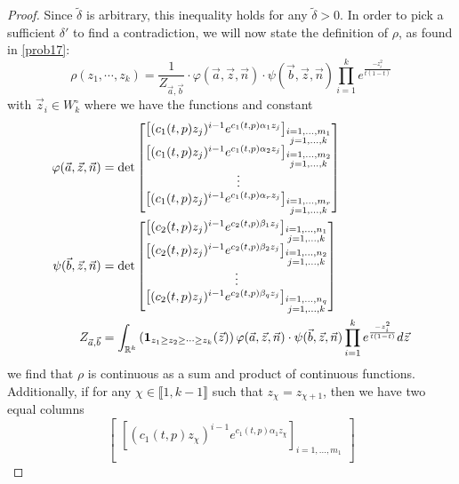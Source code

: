 \begin{proof}
	Since $\tilde\delta$ is arbitrary, this inequality holds for any $\tilde\delta>0$. 
	In order to pick a sufficient $\delta'$ to find a contradiction, we will now state the definition of $\rho$, as found in \ref{prob17}: 
	\[\rho(z_1,\cdots ,z_k)=\frac{1}{Z_{\vec a, \vec b}}\cdot \varphi(\vec a, \vec z, \vec n)\cdot \psi(\vec b, \vec z, \vec n)\prod_{i=1}^{k}e^{\frac{-z_i^2}{t(1-t)}}
	\]
	with $\vec z_i\in W_k^\circ$ where we have the functions and constant
	\begin{align*}
	\varphi(\vec a,\vec z, \vec n)&=\det\begin{bmatrix}
	\left[(c_1(t,p)z_j)^{i-1}e^{c_1(t,p)\alpha_1 z_j}\right]_{\substack{i=1,...,m_1\\j=1,...,k}}\\
	\left[(c_1(t,p)z_j)^{i-1}e^{c_1(t,p)\alpha_2 z_j}\right]_{\substack{i=1,...,m_2\\j=1,...,k}}\\
	\vdots \\
	\left[(c_1(t,p)z_j)^{i-1}e^{c_1(t,p)\alpha_r z_j}\right]_{\substack{i=1,...,m_r\\j=1,...,k}}
	\end{bmatrix}\\
	\psi(\vec b, \vec z, \vec n)&=\det\begin{bmatrix}
	\left[(c_2(t,p)z_j)^{i-1}e^{c_2(t,p)\beta_1 z_j}\right]_{\substack{i=1,...,n_1\\j=1,...,k}}\\
	\left[(c_2(t,p)z_j)^{i-1}e^{c_2(t,p)\beta_2 z_j}\right]_{\substack{i=1,...,n_2\\j=1,...,k}}\\
	\vdots \\
	\left[(c_2(t,p)z_j)^{i-1}e^{c_2(t,p)\beta_q z_j}\right]_{\substack{i=1,...,n_q\\j=1,...,k}}
	\end{bmatrix}\\
	Z_{\vec a, \vec b}&=\int_{\mathbb{R}^k}\left(\operatorname{\mathbf{1}}_{z_1\geq z_2\geq \cdots \geq z_k}(\vec z)\right)\varphi(\vec a, \vec z, \vec n)\cdot \psi(\vec b, \vec z, \vec n)\prod_{i=1}^{k}e^{\frac{-z_i^2}{t(1-t)}} d\vec z
	\end{align*} we find that $\rho$ is continuous as a sum and product of continuous functions. Additionally, if for any $\chi\in\llbracket 1,k-1 \rrbracket$ such that $z_\chi=z_{\chi+1}$, then we have two equal columns 
	\[\begin{bmatrix}
	\left[(c_1(t,p)z_\chi)^{i-1}e^{c_1(t,p)\alpha_1 z_\chi}\right]_{i=1,...,m_1}\\

\end{bmatrix}\]
\end{proof}
